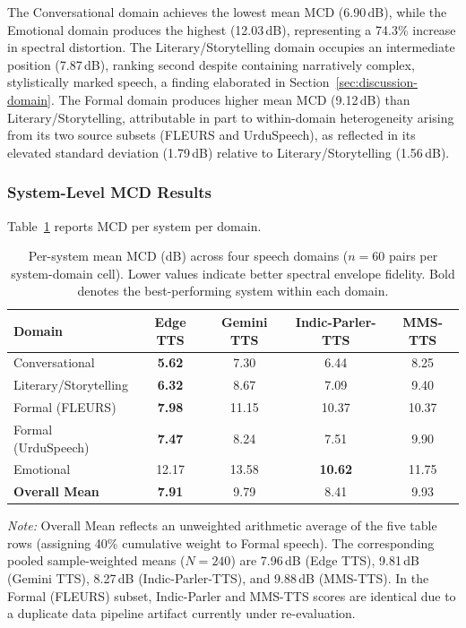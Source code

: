 \documentclass[a4paper,fleqn]{cas-dc}
\begin{document}
    \hspace*{1.2em} The Conversational domain achieves the lowest mean MCD (6.90\,dB), while the Emotional domain produces the highest (12.03\,dB), representing a 74.3\% increase in spectral distortion. The Literary/Storytelling domain occupies an intermediate position (7.87\,dB), ranking second despite containing narratively complex, stylistically marked speech, a finding elaborated in Section~\ref{sec:discussion-domain}. The Formal domain produces higher mean MCD (9.12\,dB) than Literary/Storytelling, attributable in part to within-domain heterogeneity arising from its two source subsets (FLEURS and UrduSpeech), as reflected in its elevated standard deviation (1.79\,dB) relative to Literary/Storytelling (1.56\,dB).
    
    \subsubsection{System-Level MCD Results}
    
    \hspace*{1.2em} Table~\ref{tbl:mcd_system} reports MCD per system per domain.

    \begin{table}[t]
    \caption{Per-system mean MCD (dB) across four speech domains ($n = 60$
    pairs per system-domain cell). Lower values indicate better spectral
    envelope fidelity. Bold denotes the best-performing system within each
    domain.}\label{tbl:mcd_system}
    
    \small
    \renewcommand{\arraystretch}{1.15}
    
    \begin{tabular*}{\textwidth}{@{\extracolsep{\fill}}lcccc@{}}
    \toprule
    \textbf{Domain} & \textbf{Edge TTS} & \textbf{Gemini TTS} &
    \textbf{Indic-Parler-TTS} & \textbf{MMS-TTS} \\
    \midrule
    Conversational        & \textbf{5.62} & 7.30 & 6.44 & 8.25 \\
    Literary/Storytelling & \textbf{6.32} & 8.67 & 7.09 & 9.40 \\
    Formal (FLEURS)       & \textbf{7.98} & 11.15 & 10.37 & 10.37 \\
    Formal (UrduSpeech)    & \textbf{7.47} & 8.24 & 7.51 & 9.90 \\
    Emotional             & 12.17          & 13.58 & \textbf{10.62} & 11.75 \\
    \midrule
    \textbf{Overall Mean} & \textbf{7.91} & 9.79 & 8.41 & 9.93 \\
    \bottomrule
    \end{tabular*}
    \vspace{1mm}
    \footnotesize\textit{Note:} Overall Mean reflects an unweighted arithmetic average of the five table rows (assigning 40\% cumulative weight to Formal speech). The corresponding pooled sample-weighted means ($N=240$) are 7.96\,dB (Edge TTS), 9.81\,dB (Gemini TTS), 8.27\,dB (Indic-Parler-TTS), and 9.88\,dB (MMS-TTS). In the Formal (FLEURS) subset, Indic-Parler and MMS-TTS scores are identical due to a duplicate data pipeline artifact currently under re-evaluation.
    \end{table}
    
\end{document}
